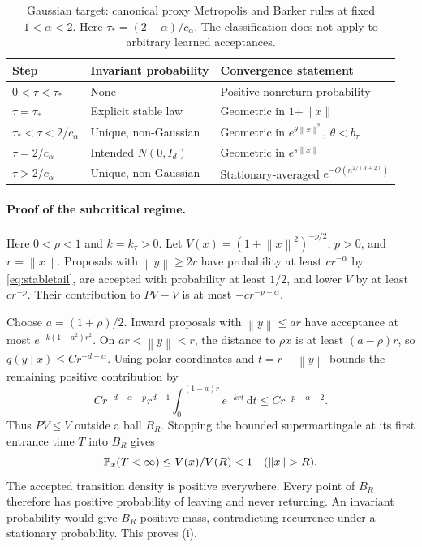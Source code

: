 \documentclass[pdflatex,iicol,sn-mathphys-ay]{sn-jnl}
\theoremstyle{definition}\newtheorem{definition}[theorem]{Definition}
\theoremstyle{remark}\newtheorem{remark}[theorem]{Remark}
\numberwithin{equation}{section}
\newcommand{\norm}[1]{\left\lVert#1\right\rVert}\newcommand{\TV}{\mathrm{TV}}
\newcommand{\dd}{\,\mathrm d}\newcommand{\cA}{c_\alpha}\newcommand{\sg}{\operatorname{sigmoid}}
\newcommand{\1}{\mathbf 1}
\begin{document}
\begin{table}[t]\centering\small
\caption{Gaussian target: canonical proxy Metropolis and Barker rules at fixed $1<\alpha<2$. Here $\tau_*=(2-\alpha)/c_\alpha$. The classification does not apply to arbitrary learned acceptances.}\label{tab:phaseclassification}
\begin{tabular}{@{}p{.22\linewidth}p{.38\linewidth}p{.31\linewidth}@{}}\toprule
Step & Invariant probability & Convergence statement\\\midrule
$0<\tau<\tau_*$ & None & Positive nonreturn probability\\
$\tau=\tau_*$ & Explicit stable law & Geometric in $1+\|x\|$\\
$\tau_*<\tau<2/c_\alpha$ & Unique, non-Gaussian & Geometric in $e^{\theta\|x\|^2}$, $\theta<b_\tau$\\
$\tau=2/c_\alpha$ & Intended $N(0,I_d)$ & Geometric in $e^{s\|x\|}$\\
$\tau>2/c_\alpha$ & Unique, non-Gaussian & Stationary-averaged $e^{-\Theta(n^{2/(\alpha+2)})}$\\\bottomrule
\end{tabular}
\end{table}

\paragraph{Proof of the subcritical regime.}
Here $0<\rho<1$ and $k=k_\tau>0$. Let $V(x)=(1+\norm x^2)^{-p/2}$, $p>0$, and $r=\norm x$. Proposals with $\norm y\ge2r$ have probability at least $cr^{-\alpha}$ by \eqref{eq:stabletail}, are accepted with probability at least $1/2$, and lower $V$ by at least $cr^{-p}$. Their contribution to $PV-V$ is at most $-cr^{-p-\alpha}$.

Choose $a=(1+\rho)/2$. Inward proposals with $\norm y\le ar$ have acceptance at most $e^{-k(1-a^2)r^2}$. On $ar<\norm y<r$, the distance to $\rho x$ is at least $(a-\rho)r$, so $q(y\mid x)\le Cr^{-d-\alpha}$. Using polar coordinates and $t=r-\norm y$ bounds the remaining positive contribution by
\[
Cr^{-d-\alpha-p}r^{d-1}\int_0^{(1-a)r}e^{-krt}\dd t
\le Cr^{-p-\alpha-2}.
\]
Thus $PV\le V$ outside a ball $B_R$. Stopping the bounded supermartingale at its first entrance time $T$ into $B_R$ gives
\[
\Prob_x(T<\infty)\le V(x)/V(R)<1\quad(\norm x>R).
\]
The accepted transition density is positive everywhere. Every point of $B_R$ therefore has positive probability of leaving and never returning. An invariant probability would give $B_R$ positive mass, contradicting recurrence under a stationary probability. This proves (i).
\end{document}
